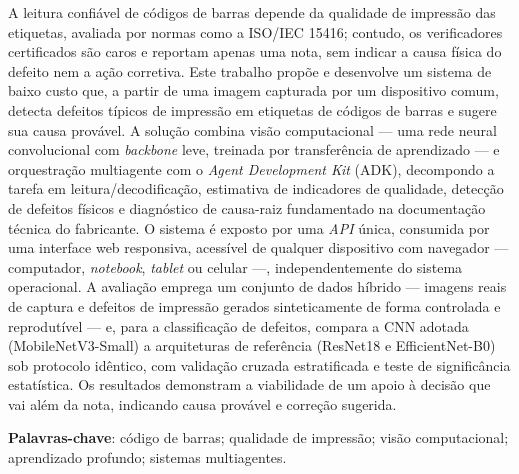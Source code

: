 \documentclass[
	article,			%
	11pt,				%
	oneside,			%
	a4paper,			%
	english,			%
	brazilian,			%
	sumario=tradicional
	]{abntex2}
\begin{document}
\frenchspacing

\maketitle

\begin{resumoumacoluna}
A leitura confiável de códigos de barras depende da qualidade de impressão das
etiquetas, avaliada por normas como a ISO/IEC 15416; contudo, os verificadores
certificados são caros e reportam apenas uma nota, sem indicar a causa física
do defeito nem a ação corretiva. Este trabalho propõe e desenvolve um sistema de
baixo custo que, a partir de uma imagem capturada por um dispositivo comum,
detecta defeitos típicos de impressão em etiquetas de códigos de barras e sugere
sua causa provável. A solução combina visão computacional --- uma rede neural
convolucional com \textit{backbone} leve, treinada por transferência de
aprendizado --- e orquestração multiagente com o \textit{Agent Development Kit}
(ADK), decompondo a tarefa em leitura/decodificação, estimativa de indicadores de
qualidade, detecção de defeitos físicos e diagnóstico de causa-raiz fundamentado
na documentação técnica do fabricante. O sistema é exposto por uma \textit{API}
única, consumida por uma interface web responsiva, acessível de qualquer
dispositivo com navegador --- computador, \textit{notebook}, \textit{tablet} ou
celular ---, independentemente do sistema operacional. A avaliação emprega um
conjunto de dados híbrido --- imagens reais de captura e defeitos de impressão
gerados sinteticamente de forma controlada e reprodutível --- e, para a
classificação de defeitos, compara a CNN adotada (MobileNetV3-Small) a
arquiteturas de referência (ResNet18 e EfficientNet-B0) sob protocolo idêntico,
com validação cruzada estratificada e teste de significância estatística. Os
resultados demonstram a viabilidade de um apoio à decisão que vai além da nota,
indicando causa provável e correção sugerida.

\noindent
\textbf{Palavras-chave}: código de barras; qualidade de impressão; visão
computacional; aprendizado profundo; sistemas multiagentes.
\end{resumoumacoluna}
\end{document}

